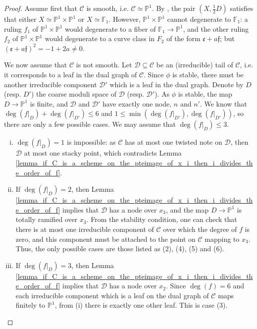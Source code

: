 \documentclass[a4paper,12pt]{amsart}
\newcommand{\mtc}[1]{\mathcal{#1}}
\newcommand{\mtf}[1]{\mathfrak{#1}}
\newcommand{\bF}{\mathbb{F}}
\newcommand{\bP}{{\mathbb P}}
\newcommand\cD{{\mathcal{D}}}
\newcommand\cC{{\mathcal{C}}}
\theoremstyle{definition}
\theoremstyle{remark}
\begin{document}
\begin{proof}  Assume first that $\cC$ is smooth, i.e. $\mtc{C}\simeq \bP^1$. By , the pair $(X,\frac{1}{2}D)$ satisfies that either $X\simeq \bP^1\times \bP^1$ or $X\simeq \bF_1$. However, $\bP^1\times\bP^1$ cannot degenerate to $\bF_1$: a ruling $f_1$ of $\bP^1\times \bP^1$ would degenerate to a fiber of $\bF_1\to \bP^1$, and the other ruling $f_2$ of $\bP^1\times \bP^1$ would degenerate to a curve class in $F_2$ of the form $\mtf{e} + a \mtf{f}$; but $(\mtf{e} + a \mtf{f})^2 = -1 +2a\neq  0$.

We now assume that $\cC$ is not smooth. 
Let $\cD\subseteq \cC$ be an (irreducible) tail of $\cC$, i.e. it corresponds to a leaf in the dual graph of $\cC$. Since $\phi$ is stable, there must be another irreducible component $\cD'$ which is a leaf in the dual graph. Denote by $D$ (resp. $D'$) the coarse moduli space of $\cD$ (resp. $\cD'$). As $\phi$ is stable, the map $D\to \bP^1$ is finite, and $\cD$ and $\cD'$ have exactly one node, $n$ and $n'$. We know that $\deg(f|_{D})+\deg(f|_{D'})\le 6$ and $1\le\min( \deg(f|_{D'}),\deg(f|_{D'}))$, so there are only a few possible cases. We may assume that $\deg (f|_{D})\leq 3$.
\begin{enumerate}[(i)]
    \item $\deg(f|_{D})=1$ is impossible: as $\cC$ has at most one twisted note on $\cD$, then $\mtc{D}$ at most one stacky point, which contradicts Lemma \ref{lemma_if_C_is_a_scheme_on_the_pteimage_of_x_i_then_i_divides_the_order_of_f}.
    \item If $\deg(f|_{D})=2$, then Lemma \ref{lemma_if_C_is_a_scheme_on_the_pteimage_of_x_i_then_i_divides_the_order_of_f} implies that $\cD$ has a node over $x_3$, and the map $D\to \bP^1$ is totally ramified over $x_3$. From the stability condition, one can check that there is at most one irreducible component of $\cC$ over which the degree of $f$ is zero, and this component must be attached to the point on $\cC$ mapping to $x_3$. Thus, the only possible cases are those listed as (2), (4), (5) and (6).
    \item If $\deg(f|_{D})=3$, then Lemma \ref{lemma_if_C_is_a_scheme_on_the_pteimage_of_x_i_then_i_divides_the_order_of_f} implies that $\cD$ has a node over $x_2$. Since $\deg(f)=6$ and each irreducible component which is a leaf on the dual graph of $\cC$ maps finitely to $\bP^1$, from (i) there is exactly one other leaf. This is case (3).
\end{enumerate}\end{proof}
\end{document}
